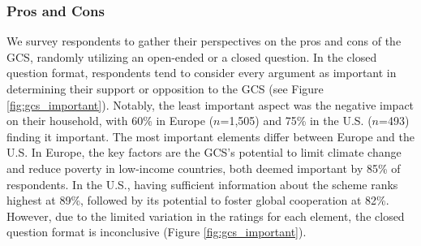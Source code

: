   


\subsubsection{Pros and Cons}\label{subsubsec:pros_cons}

We survey respondents to gather their perspectives on the pros and cons of the GCS, randomly utilizing an open-ended or a closed question. In the closed question format, respondents tend to consider every argument as important in determining their support or opposition to the GCS (see Figure \ref{fig:gcs_important}). Notably, the least important aspect was the negative impact on their household, with 60\% in Europe ($n$=1,505) and 75\% in the U.S. ($n$=493) finding it important. The most important elements differ between Europe and the U.S. In Europe, the key factors are the GCS's potential to limit climate change and reduce poverty in low-income countries, both deemed important by 85\% of respondents. In the U.S., having sufficient information about the scheme ranks highest at 89\%, followed by its potential to foster global cooperation at 82\%. However, due to the limited variation in the ratings for each element, the closed question format is inconclusive (Figure \ref{fig:gcs_important}). %

